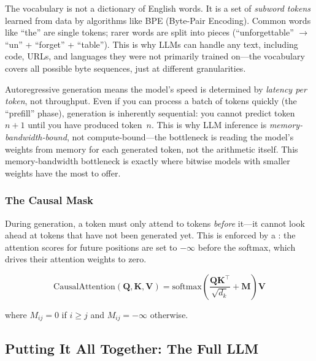 \begin{engineernote}
The vocabulary is not a dictionary of English words. It is a set of
\emph{subword tokens} learned from data by algorithms like BPE
(Byte-Pair Encoding). Common words like ``the'' are single tokens;
rarer words are split into pieces (``unforgettable'' $\to$ ``un'' +
``forget'' + ``table''). This is why LLMs can handle any text,
including code, URLs, and languages they were not primarily trained
on---the vocabulary covers all possible byte sequences, just at
different granularities.
\end{engineernote}

\begin{keyinsight}
Autoregressive generation means the model's speed is determined by
\emph{latency per token}, not throughput. Even if you can process a
batch of tokens quickly (the ``prefill'' phase), generation is
inherently sequential: you cannot predict token~$n{+}1$ until you
have produced token~$n$. This is why LLM inference is
\emph{memory-bandwidth-bound}, not compute-bound---the bottleneck is
reading the model's weights from memory for each generated token, not
the arithmetic itself. This memory-bandwidth bottleneck is exactly
where bitwise models with smaller weights have the most to offer.
\end{keyinsight}

\subsubsection{The Causal Mask}

During generation, a token must only attend to tokens \emph{before}
it---it cannot look ahead at tokens that have not been generated yet.
This is enforced by a : the attention scores for
future positions are set to $-\infty$ before the softmax, which drives
their attention weights to zero.

\begin{equation}
  \text{CausalAttention}(\bm{Q}, \bm{K}, \bm{V}) =
  \text{softmax}\!\left(
    \frac{\bm{Q}\bm{K}^\top}{\sqrt{d_k}} + \bm{M}
  \right)\bm{V}
\end{equation}

where $M_{ij} = 0$ if $i \geq j$ and $M_{ij} = -\infty$ otherwise.

\subsection{Putting It All Together: The Full LLM}
\label{sec:full-llm}

